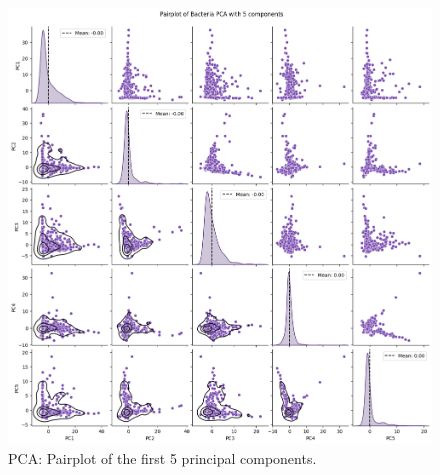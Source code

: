 \documentclass[12pt]{article}
\begin{document}
\begin{figure}[H]
    \centering
    \includegraphics[width=\textwidth]{ims/PCA.png}
    \caption{PCA: Pairplot of the first 5 principal components.}
    \label{fig:PCA}
\end{figure}
\end{document}
